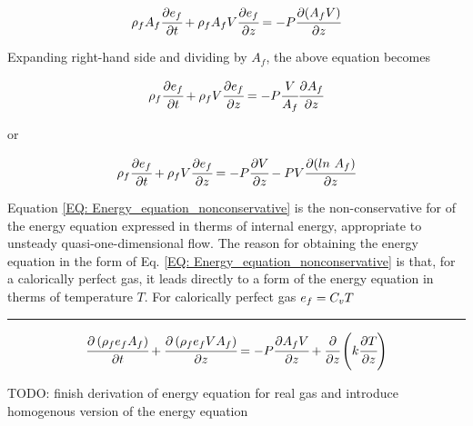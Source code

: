 \documentclass[../Article_Model_Parameters.tex]{subfiles}
\begin{document}
	{\footnotesize
		\begin{equation}
			\rho_f A_f \cfrac{\partial e_f}{\partial t} + \rho_f A_f V \cfrac{\partial e_f}{\partial z} = - P \cfrac{\partial (A_f V) }{\partial z}
		\end{equation}
	}
	
	Expanding right-hand side and dividing by $A_f$, the above equation becomes 
	
	{\footnotesize
		\begin{equation}
			\rho_f \cfrac{\partial e_f}{\partial t} + \rho_f V \cfrac{\partial e_f}{\partial z} = -P \cfrac{V}{A_f} \cfrac{\partial A_f}{\partial z}
		\end{equation}
	}

	or
	
	{\footnotesize
		\begin{equation}
			\rho_f \cfrac{\partial e_f}{\partial t} + \rho_f V \cfrac{\partial e_f}{\partial z} = -P \cfrac{\partial V}{\partial z} - P V \cfrac{\partial (ln~A_f)}{\partial z}
			\label{EQ: Energy_equation_nonconservative}
		\end{equation}
	}
	
	Equation \ref{EQ: Energy_equation_nonconservative} is the non-conservative for of the energy equation expressed in therms of internal energy, appropriate to unsteady quasi-one-dimensional flow. The reason for obtaining the energy equation in the form of Eq. \ref{EQ: Energy_equation_nonconservative} is that, for a calorically perfect gas, it leads directly to a form of the energy equation in therms of temperature $T$. For calorically perfect gas ${\footnotesize e_f=C_vT}$
	
	\hrule
	
	{\footnotesize
		\begin{equation}
			\cfrac{\partial \left( \rho_f e_f A_f \right) }{\partial t} + \cfrac{\partial \left( \rho_f  e_f V A_f \right)}{\partial z} = -P \cfrac{\partial A_f V}{\partial z} + \cfrac{\partial}{\partial z} \left( k \cfrac{\partial T}{\partial z} \right)
		\end{equation}
	}
	
	{TODO: \color{red}finish derivation of energy equation for real gas and introduce homogenous version of the energy equation}
	
	
	
	
	
	
	
	
	
	
	
	
	
	
\end{document}
